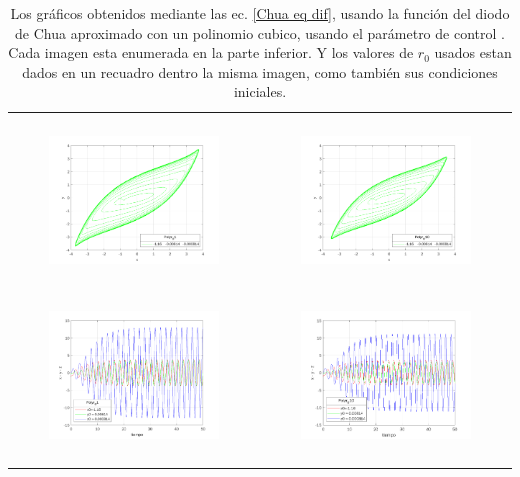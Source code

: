 \documentclass{rbf}
\begin{document}
\begin{table}[h]
    \centering
    \caption{\label{tab: imagenes numericas con valores calculados} Los gráficos obtenidos mediante las ec. \ref{Chua eq dif}, usando la función del diodo de Chua aproximado con un polinomio cubico, usando el parámetro de control \gamma. Cada imagen esta enumerada en la parte inferior. Y los valores de $r_0$ usados estan dados en un recuadro dentro la misma imagen, como también sus condiciones iniciales. \\}
    \begin{tabular}{c c}
        \hline    
        \includegraphics[width=4.5cm,height=4.5cm]{Mat_r0_pwl_poly/phaseESPACEPolyr_01.png}
        \includegraphics[width=4.5cm,height=4.5cm]{Mat_r0_pwl_poly/timeseriesPolyr_01.png}&
        \includegraphics[width=4.5cm,height=4.5cm]{Mat_r0_pwl_poly/phaseESPACEPolyr_010.png}
        \includegraphics[width=4.5cm,height=4.5cm]{Mat_r0_pwl_poly/timeseriesPolyr_010.png}&

\end{tabular}
\end{table}
\end{document}
